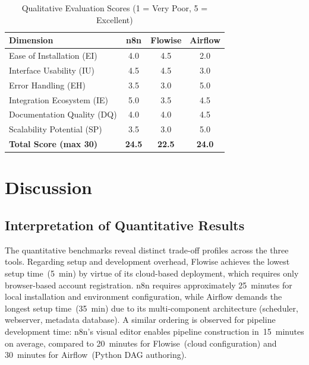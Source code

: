 \documentclass[journal]{IEEEtran}
\begin{document}
\begin{table}[!t]
  \caption{Qualitative Evaluation Scores (1 = Very Poor, 5 = Excellent)}
  \label{tab:qualitative}
  \renewcommand{\arraystretch}{1.25}
  \centering
  \small
  \begin{tabular}{@{}lccc@{}}
    \toprule
    \textbf{Dimension}            & \textbf{n8n} & \textbf{Flowise} & \textbf{Airflow} \\
    \midrule
    Ease of Installation (EI)     & 4.0 & 4.5 & 2.0 \\
    Interface Usability (IU)      & 4.5 & 4.5 & 3.0 \\
    Error Handling (EH)           & 3.5 & 3.0 & 5.0 \\
    Integration Ecosystem (IE)    & 5.0 & 3.5 & 4.5 \\
    Documentation Quality (DQ)    & 4.0 & 4.0 & 4.5 \\
    Scalability Potential (SP)    & 3.5 & 3.0 & 5.0 \\
    \midrule
    \textbf{Total Score (max 30)} & \textbf{24.5} & \textbf{22.5} & \textbf{24.0} \\
    \bottomrule
  \end{tabular}
\end{table}


\section{Discussion}
\label{sec:discussion}

\subsection{Interpretation of Quantitative Results}

The quantitative benchmarks reveal distinct trade-off profiles across the
three tools. Regarding setup and development overhead, Flowise achieves
the lowest setup time~(5~min) by virtue of its cloud-based deployment,
which requires only browser-based account registration. n8n requires
approximately 25~minutes for local installation and environment
configuration, while Airflow demands the longest setup time~(35~min)
due to its multi-component architecture (scheduler, webserver, metadata
database). A similar ordering is observed for pipeline development time:
n8n's visual editor enables pipeline construction in~15~minutes on
average, compared to 20~minutes for Flowise~(cloud configuration) and
30~minutes for Airflow~(Python DAG authoring).
\end{document}
